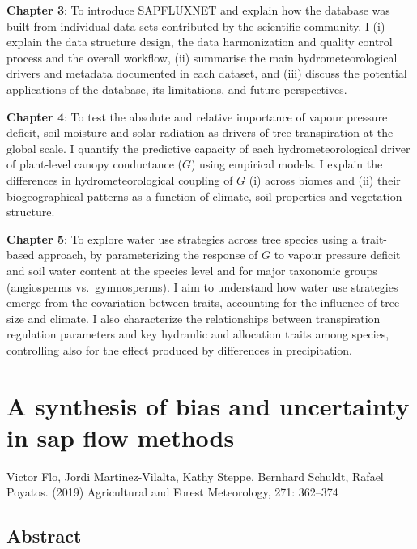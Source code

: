\documentclass[11pt,twoside]{reedthesis}
\begin{document}
\textbf{Chapter 3}: To introduce SAPFLUXNET and explain how the database
was built from individual data sets contributed by the scientific
community. I (i) explain the data structure design, the data
harmonization and quality control process and the overall workflow, (ii)
summarise the main hydrometeorological drivers and metadata documented
in each dataset, and (iii) discuss the potential applications of the
database, its limitations, and future perspectives.\par

\textbf{Chapter 4}: To test the absolute and relative importance of
vapour pressure deficit, soil moisture and solar radiation as drivers of
tree transpiration at the global scale. I quantify the predictive
capacity of each hydrometeorological driver of plant-level canopy
conductance (\(G\)) using empirical models. I explain the differences in
hydrometeorological coupling of \(G\) (i) across biomes and (ii) their
biogeographical patterns as a function of climate, soil properties and
vegetation structure.\par

\textbf{Chapter 5}: To explore water use strategies across tree species
using a trait-based approach, by parameterizing the response of \(G\) to
vapour pressure deficit and soil water content at the species level and
for major taxonomic groups (angiosperms vs.~gymnosperms). I aim to
understand how water use strategies emerge from the covariation between
traits, accounting for the influence of tree size and climate. I also
characterize the relationships between transpiration regulation
parameters and key hydraulic and allocation traits among species,
controlling also for the effect produced by differences in
precipitation.\par

\newpage

\null\newpage

\chapter[Bias and uncertainty in sap flow methods]{A synthesis of bias and uncertainty in sap flow methods}

\setlength{\parindent}{0pt} Victor Flo, Jordi Martinez-Vilalta, Kathy
Steppe, Bernhard Schuldt, Rafael Poyatos. (2019) Agricultural and Forest
Meteorology, 271: 362--374 \newpage
\setlength{\parindent}{30pt}

\section*{Abstract}
\end{document}
